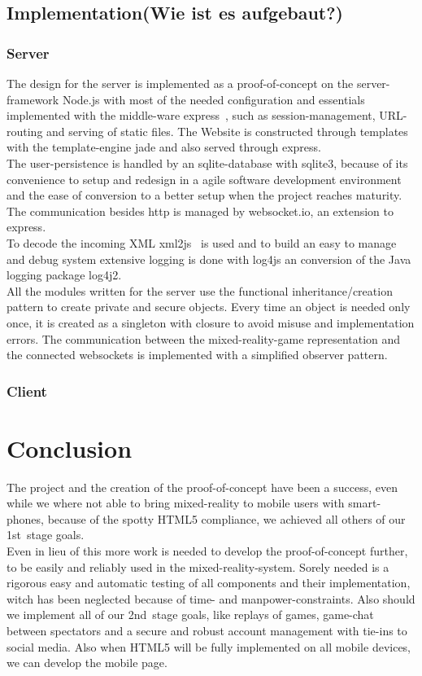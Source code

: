 \documentclass[journal]{IEEEtran}
\begin{document}
\subsection{Implementation(Wie ist es aufgebaut?)}
\subsubsection{Server}
The design for the server is implemented as a proof-of-concept on the server-framework Node.js\cite{Node.js} with most of the needed configuration and essentials implemented with the middle-ware express~\cite{express}, such as session-management, URL-routing and serving of static files. The Website is constructed through templates with the template-engine jade\cite{jade} and also served through express.\\
The user-persistence is handled by an sqlite-database with sqlite3\cite{sqlite3}, because of its convenience to setup and redesign in a agile software development environment\cite{agile_devel} and the ease of conversion to a better setup when the project reaches maturity.\\
The communication besides http is managed by websocket.io\cite{websocket.io}\cite{smash_node.js}, an extension to express.\\ 
To decode the incoming XML xml2js~\cite{xml2js} is used and to build an easy to manage and debug system extensive logging is done with log4js\cite{log4js} an conversion of the Java logging package log4j2\cite{log4j2}.\\
All the modules written for the server use the functional inheritance/creation pattern\cite{js_goodparts} to create private and secure objects. Every time an object is needed only once, it is created as a singleton with closure\cite{js_designpattern} to avoid misuse and implementation errors. The communication between the mixed-reality-game representation and the connected websockets is implemented with a simplified observer pattern\cite{js_designpattern}.\\[3mm]
\subsubsection{Client}
\section{Conclusion}
The project and the creation of the proof-of-concept have been a success, even while we where not able to bring mixed-reality to mobile users with smart-phones, because of the spotty HTML5 compliance, we achieved all others of our 1st~stage goals.\\
Even in lieu of this more work is needed to develop the proof-of-concept further, to be easily and reliably used in the mixed-reality-system. Sorely needed is a rigorous easy  and automatic testing of all components and their implementation, witch has been neglected because of time- and manpower-constraints. Also should we implement all of our 2nd~stage goals, like replays of games, game-chat between spectators and a secure and robust account management with tie-ins to social media. Also when HTML5 will be fully implemented on all mobile devices, we can develop the mobile page. 
\end{document}
